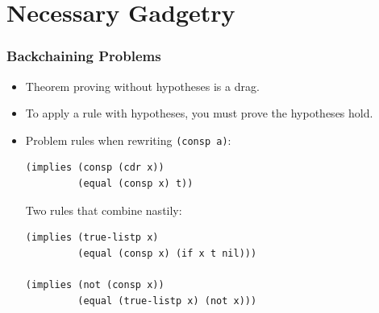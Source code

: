 \documentclass[10pt]{beamer}
\begin{document}

\section{Necessary Gadgetry}

\begin{frame}[fragile]
\frametitle{Backchaining Problems}
\begin{itemize}
 \item Theorem proving without hypotheses is a drag.
 \item To apply a rule with hypotheses, you must prove the hypotheses hold.
\pause
 \item Problem rules when rewriting \texttt{(consp a)}: \\
{\scriptsize\begin{lstlisting}
(implies (consp (cdr x))
         (equal (consp x) t)) 
\end{lstlisting}}
\pause
Two rules that combine nastily:
\pause
{\scriptsize\begin{lstlisting}
(implies (true-listp x) 
         (equal (consp x) (if x t nil))) 

(implies (not (consp x))
         (equal (true-listp x) (not x)))
\end{lstlisting}}
\end{itemize}
\end{frame}
\end{document}
